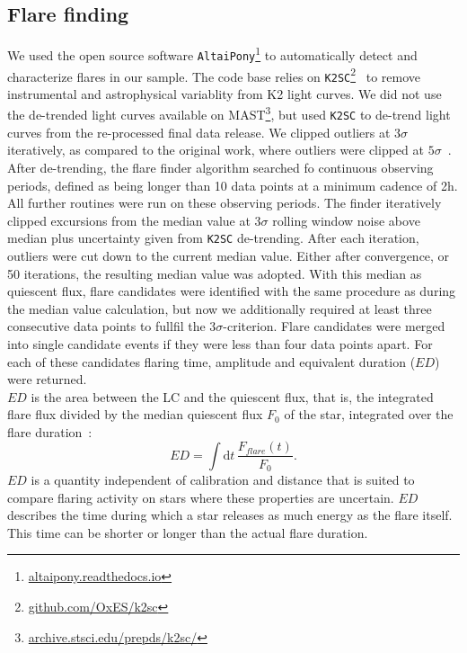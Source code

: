 \documentclass{aa}
\begin{document}
\subsection{Flare finding}
We used the open source software \texttt{AltaiPony}\footnote{\url{altaipony.readthedocs.io}} to automatically detect and characterize flares in our sample. The code base relies on \texttt{K2SC}\footnote{\url{github.com/OxES/k2sc}}~\citep{aigrain_k2sc_2016} to remove instrumental and astrophysical variablity from K2 light curves. We did not use the de-trended light curves available on MAST\footnote{\url{archive.stsci.edu/prepds/k2sc/}}, but used \texttt{K2SC} to de-trend light curves from the re-processed final data release. We clipped outliers at $3\sigma$ iteratively, as compared to the original work, where outliers were clipped at $5\sigma$~\citep{aigrain_k2sc_2016}.
\\
After de-trending, the flare finder algorithm searched fo continuous observing periods, defined as being longer than 10 data points at a minimum cadence of 2\;h. All further routines were run on these observing periods. The finder iteratively clipped excursions from the median value at $3\sigma$ rolling window noise above median plus uncertainty given from \texttt{K2SC} de-trending. After each iteration, outliers were cut down to the current median value. Either after convergence, or 50 iterations, the resulting median value was adopted. With this median as quiescent flux, flare candidates were identified with the same procedure as during the median value calculation, but now we additionally required at least three consecutive data points to fullfil the $3\sigma$-criterion. Flare candidates were merged into single candidate events if they were less than four data points apart. For each of these candidates flaring time, amplitude and equivalent duration ($ED$) were returned.
\\
$ED$ is the area between the LC and the quiescent flux, that is, the integrated flare flux divided by the median quiescent flux $F_0$ of the star, integrated over the flare duration~\citep{hunt-walker_most_2012}:
\begin{equation}
\label{05_ED}
ED=\displaystyle \int \mathrm dt\, \frac{F_{flare}(t)}{F_0}.
\end{equation}
$ED$ is a quantity independent of calibration and distance that is suited to compare flaring activity on stars where these properties are uncertain. $ED$ describes the time during which a star releases as much energy as the flare itself. This time can be shorter or longer than the actual flare duration. 
\end{document}
